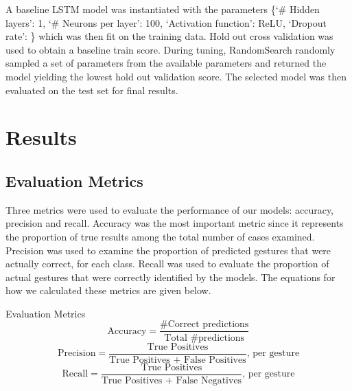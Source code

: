 \documentclass{article}
\begin{document}
A baseline LSTM model was instantiated with the parameters \{‘\# Hidden layers’: 1,  ‘\# Neurons per layer’: 100, ‘Activation function’: ReLU, ‘Dropout rate’: \} which was then fit on the training data. Hold out cross validation was used to obtain a baseline train score. During tuning, RandomSearch randomly sampled a set of parameters from the available parameters and returned the model yielding the lowest hold out validation score. The selected model was then evaluated on the test set for final results.

\section*{Results}
\subsection*{Evaluation Metrics}
Three metrics were used to evaluate the performance of our models: accuracy, precision and recall. Accuracy was the most important metric since it represents the proportion of true results among the total number of cases examined. Precision was used to examine the proportion of predicted gestures that were actually correct, for each class. Recall was used to evaluate the proportion of actual gestures that were correctly identified by the models. The equations for how we calculated these metrics are given below.

\begin{center}
Evaluation Metrics
    \[ \textrm{Accuracy} = \frac{\textrm{\# Correct predictions}}{\textrm{Total \# predictions}} \]
    \[ \textrm{Precision} = \frac{\textrm{True Positives}}{\textrm{True Positives + False Positives}} \textrm{, per gesture}\]
    \[ \textrm{Recall} = \frac{\textrm{True Positives}}{\textrm{True Positives + False Negatives}} \textrm{, per gesture}\]
\end{center}
\end{document}
